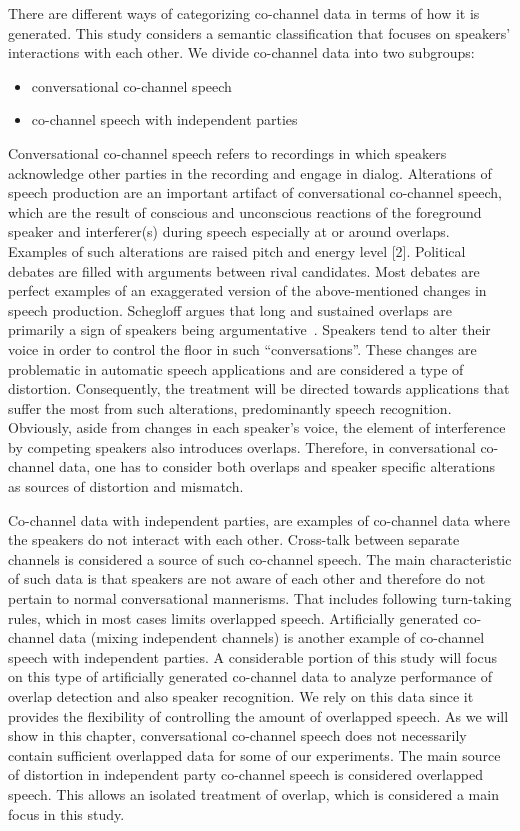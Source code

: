 There are different ways of categorizing co-channel data in terms of how it is generated. This study considers a semantic classification that focuses on speakers' interactions with each other. We divide co-channel data into two subgroups: 
\begin{itemize}
	\item conversational co-channel speech
	\item co-channel speech with independent parties
\end{itemize} 

Conversational co-channel speech refers to recordings in which speakers acknowledge other parties in the recording and engage in dialog. 
Alterations of speech production are an important artifact of conversational co-channel speech, which are the result of conscious and unconscious reactions of the foreground speaker and interferer(s) during speech especially at or around overlaps. 
Examples of such alterations are raised pitch and energy level [2]. 
Political debates are filled with arguments between rival candidates. 
Most debates are perfect examples of an exaggerated version of the above-mentioned changes in speech production. 
Schegloff argues that long and sustained overlaps are primarily a sign of speakers being argumentative~\cite{schegloff}. 
Speakers tend to alter their voice in order to control the floor in such ``conversations''. 
These changes are problematic in automatic speech applications and are considered a type of distortion. 
Consequently, the treatment will be directed towards applications that suffer the most from such alterations, predominantly speech recognition. 
Obviously, aside from changes in each speaker's voice, the element of interference by competing speakers also introduces overlaps. 
Therefore, in conversational co-channel data, one has to consider both overlaps and speaker specific alterations as sources of distortion and mismatch. 

Co-channel data with independent parties, are examples of co-channel data where the speakers do not interact with each other. 
Cross-talk between separate channels is considered a source of such co-channel speech. 
The main characteristic of such data is that speakers are not aware of each other and therefore do not pertain to normal conversational mannerisms. 
That includes following turn-taking rules, which in most cases limits overlapped speech. 
Artificially generated co-channel data (mixing independent channels) is another example of co-channel speech with independent parties. 
A considerable portion of this study will focus on this type of artificially generated co-channel data to analyze performance of overlap detection and also speaker recognition. 
We rely on this data since it provides the flexibility of controlling the amount of overlapped speech. 
As we will show in this chapter, conversational co-channel speech does not necessarily contain sufficient overlapped data for some of our experiments. 
The main source of distortion in independent party co-channel speech is considered overlapped speech. 
This allows an isolated treatment of overlap, which is considered a main focus in this study. 

